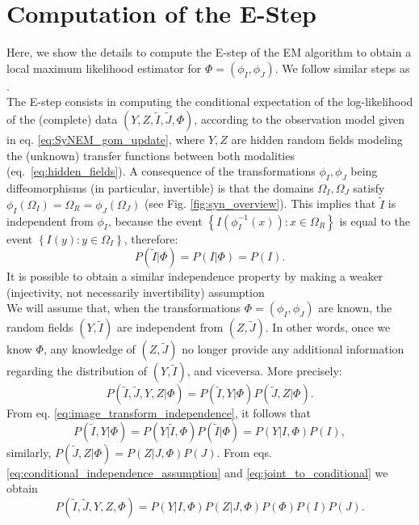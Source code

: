 \appendix
\section{Computation of the E-Step}\label{ap:E_step}
Here, we show the details to compute the E-step of the EM algorithm \citep{Dempster1977} to obtain a local maximum likelihood estimator for $\Phi = (\phi_{I}, \phi_{J})$.
We follow similar steps as \cite{Arce-santana2014}.\\

The E-step \citep{Dempster1977} consists in computing the conditional expectation of the log-likelihood of the (complete) data $(Y, Z, \tilde{I}, \tilde{J}, \Phi)$, according to the observation model given in eq. \eqref{eq:SyNEM_gom_update}, where $Y, Z$ are hidden random fields modeling the (unknown) transfer functions between both modalities \hbox{(eq. \eqref{eq:hidden_fields})}. A consequence of the transformations $\phi_{I}, \phi_{J}$ being diffeomorphisms (in particular, invertible) is that the domains $\Omega_{I}, \Omega_{J}$ satisfy \hbox{$\phi_{I}(\Omega_{I}) = \Omega_{R} = \phi_{J}(\Omega_{J})$} (see Fig. \ref{fig:syn_overview}). This implies that $\tilde{I}$ is independent from $\phi_{I}$, because the event $\left\lbrace I(\phi_{I}^{-1}(x)) : x\in \Omega_{R} \right\rbrace$ is equal to the event $\left\lbrace I(y) : y\in \Omega_{I} \right\rbrace$, therefore:
\begin{equation}\label{eq:image_transform_independence}
     P(\tilde{I} | \Phi) = P(I | \Phi) = P(I).
\end{equation}
It is possible to obtain a similar independence property by making a weaker (injectivity, not necessarily invertibility) assumption \citep[see][pg. 73]{Roche2000}\\

We will assume that, when the transformations $\Phi=(\phi_{I}, \phi_{J})$ are known, the random fields $(Y, \tilde{I})$ are independent from $(Z, \tilde{J})$. In other words, once we know $\Phi$, any knowledge of $(Z, \tilde{J})$ no longer provide any additional information regarding the distribution of $(Y, \tilde{I})$, and viceversa. More precisely:
\begin{equation}\label{eq:conditional_independence_assumption}
    P(\tilde{I}, \tilde{J}, Y, Z | \Phi) = P(\tilde{I}, Y | \Phi)P(\tilde{J}, Z| \Phi).
\end{equation}
From eq. \eqref{eq:image_transform_independence}, it follows that
\begin{equation}\label{eq:joint_to_conditional}
    P(\tilde{I}, Y | \Phi) = P(Y | \tilde{I}, \Phi)P(\tilde{I} | \Phi) = P(Y | I, \Phi)P(I),
\end{equation}
similarly, $P(\tilde{J}, Z| \Phi) = P(Z| J, \Phi)P(J)$. From eqs. \eqref{eq:conditional_independence_assumption} and \eqref{eq:joint_to_conditional} we obtain
\begin{equation}\label{eq:simplified_joint_prob}
    P(\tilde{I}, \tilde{J}, Y, Z, \Phi) = P(Y | I, \Phi)P(Z| J, \Phi)P(\Phi)P(I)P(J).
\end{equation}

